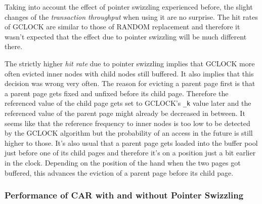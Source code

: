     Taking into account the effect of pointer swizzling experienced before, the slight changes of the \emph{transaction throughput} when using it are no surprise. The hit rates of GCLOCK are similar to those of RANDOM replacement and therefore it wasn't expected that the effect due to pointer swizzling will be much different there.

    The strictly higher \emph{hit rate} due to pointer swizzling implies that GCLOCK more often evicted inner nodes with child nodes still buffered. It also implies that this decision was wrong very often. The reason for evicting a parent page first is that a parent page gets fixed and unfixed before its child page. Therefore the referenced value of the child page gets set to GCLOCK's \lstinline{_k} value later and the referenced value of the parent page might already be decreased in between. It seems like that the reference frequency to inner nodes is too low to be detected by the GCLOCK algorithm but the probability of an access in the future is still higher to those. It's also usual that a parent page gets loaded into the buffer pool just before one of its child pages and therefore it's on a position just a bit earlier in the clock. Depending on the position of the hand when the two pages got buffered, this advances the eviction of a parent page before its child page.

\subsubsection{Performance of CAR with and without Pointer Swizzling}


